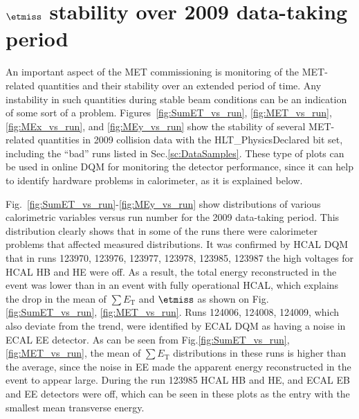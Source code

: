 \section{$\etmiss$ stability over 2009 data-taking period}
\label{sc:METStab}

An important aspect of the MET commissioning is monitoring of the
MET-related quantities and their stability over an extended period of
time. Any instability in such quantities during stable beam conditions
can be an indication of some sort of a problem.
Figures~\ref{fig:SumET_vs_run}, \ref{fig:MET_vs_run},
\ref{fig:MEx_vs_run}, and \ref{fig:MEy_vs_run} show the stability of
several MET-related quantities in 2009 collision data with the
HLT\_PhysicsDeclared bit set, including the ``bad'' runs listed in
Sec.\ref{sc:DataSamples}. These type of plots can be used in online DQM
for monitoring the detector performance, since it can help to identify
hardware problems in calorimeter, as it is explained below.

Fig.~\ref{fig:SumET_vs_run}-\ref{fig:MEy_vs_run} show distributions of
various calorimetric variables versus run number for the 2009 data-taking
period. This distribution clearly shows that in some of the runs there
were calorimeter problems that affected measured distributions. It was
confirmed by HCAL DQM that in runs 123970, 123976, 123977,
123978, 123985, 123987 the high voltages for HCAL HB and HE were off. As
a result, the total energy reconstructed in the event was lower than in
an event with fully operational HCAL, which explains the drop in
the mean of $\sum E_\text{T}$ and $\etmiss$ as shown on
Fig.\ref{fig:SumET_vs_run}, \ref{fig:MET_vs_run}. Runs 124006, 124008, 124009, which
also deviate from the trend, were identified by ECAL DQM as having a
noise in ECAL EE detector. As can be seen from
Fig.\ref{fig:SumET_vs_run}, \ref{fig:MET_vs_run}, the mean of $\sum E_\text{T}$
distributions in these runs is higher than the average, since the noise
in EE made the apparent energy reconstructed in the event to appear
large. During the run 123985 HCAL HB and HE, and ECAL EB and EE
detectors were off, which can be
seen in these plots as the entry with the smallest mean transverse
energy. 

